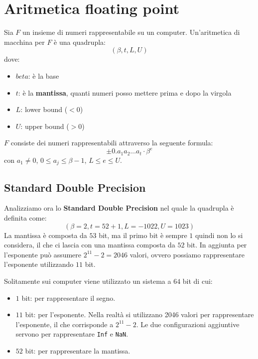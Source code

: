 \section{Aritmetica floating point}
\begin{definizione}
    Sia $F$ un insieme di numeri rappresentabile su un computer. Un'aritmetica
    di macchina per $F$ è una quadrupla:
    \begin{equation}
        (\beta, t, L, U)
    \end{equation}
    dove:
    \begin{itemize}
        \item $beta$: è la base
        \item $t$: è la \textbf{mantissa}, quanti numeri posso mettere prima e
              dopo la virgola
        \item $L$: lower bound ($< 0$)
        \item $U$: upper bound ($> 0$)
    \end{itemize}
\end{definizione}
$F$ consiste dei numeri rappresentabili attraverso la seguente formula:
\begin{equation}
    \pm 0.a_1a_2\dots a_t\cdot \beta ^e
\end{equation}
con $a_1 \neq 0$, $0 \leq a_j \leq \beta-1$, $L\leq e \leq U$.
\subsection{Standard Double Precision}
Analizziamo ora lo \textbf{Standard Double Precision} nel quale la quadrupla è
definita come:
\begin{equation}
    (\beta = 2, t = 52 + 1, L = -1022, U = 1023)
\end{equation}
La mantissa è composta da $53$ bit, ma il primo bit è sempre $1$ quindi non lo
si considera, il che ci lascia con una mantissa composta da $52$ bit. In aggiunta
per l'esponente può assumere $2^{11} - 2 = 2046$ valori, ovvero possiamo rappresentare
l'esponente utilizzando $11$ bit.

Solitamente sui computer viene utilizzato un sistema a $64$ bit di cui:
\begin{itemize}
    \item $1$ bit: per rappresentare il segno.
    \item $11$ bit: per l'esponente. Nella realtà si utilizzano 2046 valori per
          rappresentare l'esponente, il che corrisponde a $2^{11} - 2$. Le due
          configurazioni aggiuntive servono per rappresentare \texttt{Inf} e
          \texttt{NaN}.
    \item $52$ bit: per rappresentare la mantissa.
\end{itemize}
